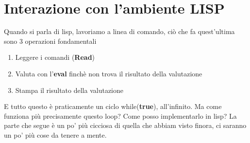 \documentclass[12pt, a4paper, openany, oneside]{book}
\begin{document}
\section{Interazione con l'ambiente LISP}
Quando si parla di lisp, lavoriamo a linea di comando, ciò che fa quest'ultima
sono 3 operazioni fondamentali
\begin{enumerate}
	\item Leggere i comandi (\textbf{Read})
	\item Valuta con l'\textbf{eval} finchè non trova il risultato della valutazione
	\item Stampa il risultato della valutazione
\end{enumerate}
E tutto questo è praticamente un ciclo while(\textbf{true}), all'infinito. Ma
come funziona più precisamente questo loop? Come posso implementarlo in lisp?
La parte che segue è un po' più cicciosa di quella che abbiam visto finora, 
ci saranno un po' più cose da tenere a mente. 
\end{document}
